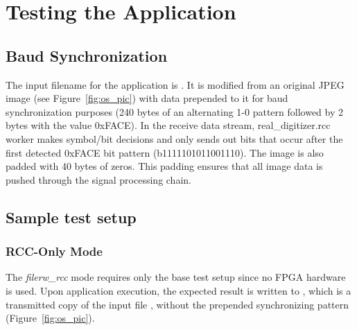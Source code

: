 \section{Testing the Application}
\subsection{Baud Synchronization}
\label{sec:baud_sync}
The input filename for the application is . It is modified from an original JPEG image (see Figure~\ref{fig:os_pic}) with data prepended to it for baud synchronization purposes (240 bytes of an alternating 1-0 pattern followed by 2 bytes with the value 0xFACE). In the receive data stream, real\_digitizer.rcc worker makes symbol/bit decisions and only sends out bits that occur after the first detected 0xFACE bit pattern (b1111101011001110). The image is also padded with 40 bytes of zeros. This padding ensures that all image data is pushed through the signal processing chain.
\subsection{Sample test setup}
\subsubsection{RCC-Only Mode}
The \textit{filerw\_rcc} mode requires only the base test setup since no FPGA hardware is used.
Upon application execution, the expected result is written to , which is a transmitted copy of the input file , without the prepended synchronizing pattern (Figure~\ref{fig:os_pic}).

